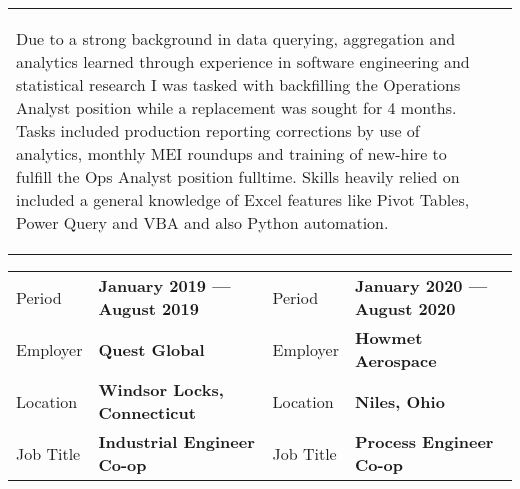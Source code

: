 \documentclass[a4paper, oneside, final, fontsize=9pt, usegeometry]{scrartcl} %
\newcommand{\gray}{\rowcolor[gray]{.90}} %
\begin{document}
\begin{center}
\begin{tabularx}{0.97\linewidth}{XX}
\begin{itemize}
			\begin{sloppypar}
				Due to a strong background in data querying, aggregation and analytics learned through experience in software engineering and statistical research I was tasked with backfilling the Operations Analyst position while a replacement was sought for 4 months. Tasks included production reporting corrections by use of analytics, monthly MEI roundups and training of new-hire to fulfill the Ops Analyst position fulltime. Skills heavily relied on included a general knowledge of Excel features like Pivot Tables, Power Query and VBA and also Python automation.
			\end{sloppypar}
		\end{itemize}
	\end{tabularx}

	\vspace{-8pt}

	\begin{tabularx}{0.97\linewidth}{ZY|ZY}
		\gray{}Period    & \textbf{January 2019 --- August 2019} & Period    & \textbf{January 2020 --- August 2020} \\
		\gray{}Employer  & \textbf{Quest Global}                 & Employer  & \textbf{Howmet Aerospace}             \\
		\gray{}Location  & \textbf{Windsor Locks, Connecticut}   & Location  & \textbf{Niles, Ohio}                  \\
		\gray{}Job Title & \textbf{Industrial Engineer Co-op}    & Job Title & \textbf{Process Engineer Co-op}       \\
	\end{tabularx}


\end{center}
\end{document}
